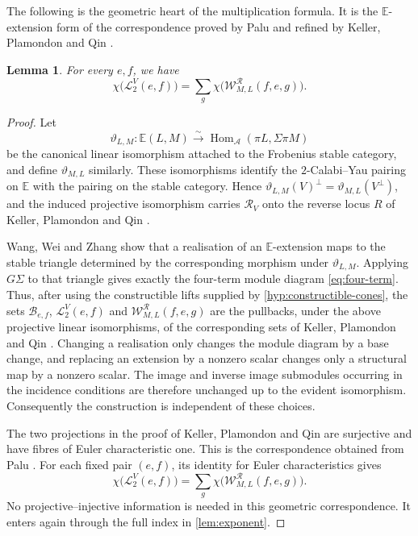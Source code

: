 \documentclass[11pt,reqno]{article}
\numberwithin{equation}{section}
\newtheorem{lemma}[lemma]{Lemma}
\theoremstyle{definition}
\DeclareMathOperator{\Hom}{Hom}
\newcommand{\A}{\mathcal A}
\newcommand{\E}{\mathbb E}
\begin{document}
The following is the geometric heart of the multiplication formula.  It is the $\E$-extension form of the correspondence proved by Palu \cite[Propositions~3.3 and~3.4]{Palu2012} and refined by Keller, Plamondon and Qin \cite[Lemmas~2.13 and~2.14]{KellerPlamondonQin}.

\begin{lemma}\label{lem:complement}
For every $e,f$, we have
\[
 \chi\bigl(\mathcal L^V_2(e,f)\bigr)
 =\sum_g\chi\bigl(\mathcal W^{\mathcal R}_{M,L}(f,e,g)\bigr).
\]
\end{lemma}

\begin{proof}
Let
\[
 \vartheta_{L,M}\colon\E(L,M)\xrightarrow{\sim}
 \Hom_{\A}(\pi L,\Sigma\pi M)
\]
be the canonical linear isomorphism attached to the Frobenius stable category, and define $\vartheta_{M,L}$ similarly.  These isomorphisms identify the $2$-Calabi--Yau pairing on $\E$ with the pairing on the stable category.  Hence $\vartheta_{L,M}(V)^\perp=\vartheta_{M,L}(V^\perp)$, and the induced projective isomorphism carries $\mathcal R_V$ onto the reverse locus $R$ of Keller, Plamondon and Qin \cite[Lemma~2.14]{KellerPlamondonQin}.

Wang, Wei and Zhang \cite[Lemma~3.1]{WangWeiZhangCC} show that a realisation of an $\E$-extension maps to the stable triangle determined by the corresponding morphism under $\vartheta_{L,M}$.  Applying $G\Sigma$ to that triangle gives exactly the four-term module diagram \eqref{eq:four-term}.  Thus, after using the constructible lifts supplied by \cref{hyp:constructible-cones}, the sets $\mathcal B_{e,f}$, $\mathcal L^V_2(e,f)$ and $\mathcal W^{\mathcal R}_{M,L}(f,e,g)$ are the pullbacks, under the above projective linear isomorphisms, of the corresponding sets of Keller, Plamondon and Qin \cite[Lemmas~2.13 and~2.14]{KellerPlamondonQin}.  Changing a realisation only changes the module diagram by a base change, and replacing an extension by a nonzero scalar changes only a structural map by a nonzero scalar. The image and inverse image submodules occurring in the incidence conditions are therefore unchanged up to the evident isomorphism.  Consequently the construction is independent of these choices.

The two projections in the proof of Keller, Plamondon and Qin \cite[Lemma~2.14]{KellerPlamondonQin} are surjective and have fibres of Euler characteristic one. This is the correspondence obtained from Palu \cite[Propositions~3.3 and~3.4]{Palu2012}. For each fixed pair $(e,f)$, its identity for Euler characteristics gives
\[
 \chi\bigl(\mathcal L^V_2(e,f)\bigr)
 =\sum_g\chi\bigl(\mathcal W^{\mathcal R}_{M,L}(f,e,g)\bigr).
\]
No projective--injective information is needed in this geometric correspondence. It enters again through the full index in \cref{lem:exponent}.
\end{proof}
\end{document}
